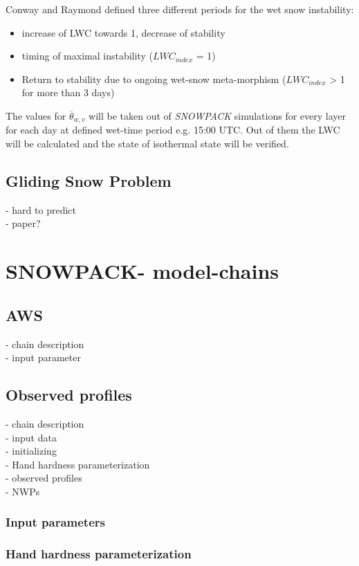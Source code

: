\noindent Conway and Raymond \autocite{conwaySnowStabilityRain1993} defined three different periods for the wet snow
instability:
\begin{itemize}
    \item increase of LWC towards 1, decrease of stability
    \item timing of maximal instability ($LWC_{index}$ = 1)
    \item Return to stability due to ongoing wet-snow meta-morphism ($LWC_{index}$ > 1 for more than 3 days)
\end{itemize}

\noindent The values for $\overline{ \theta}_{w,v }$ will be taken out of \textit{SNOWPACK} simulations for every layer
for each day at defined wet-time period e.g. 15:00 UTC. Out of them the LWC will be calculated and the state of 
isothermal state will be verified.

\subsection{Gliding Snow Problem}

- hard to predict \\
- paper? 

\section{SNOWPACK- model-chains}

\subsection {AWS}
- chain description \\
- input parameter\\


\subsection {Observed profiles}
- chain description\\
- input data\\
- initializing\\
- Hand hardness parameterization\\
- observed profiles\\
- NWPs

\subsubsection{Input parameters}

\subsubsection{Hand hardness parameterization}
